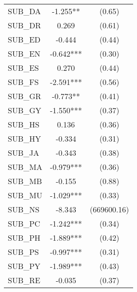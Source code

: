 \begin{table}[htb]
\begin{threeparttable}
\begin{tabular}{l c c}
      SUB\_DA                               & -1.255**               & (0.65)               \\
      SUB\_DR                               & 0.269                  & (0.61)               \\
      SUB\_ED                               & -0.444                 & (0.44)               \\
      SUB\_EN                               & -0.642***              & (0.30)               \\
      SUB\_ES                               & 0.270                  & (0.44)               \\
      SUB\_FS                               & -2.591***              & (0.56)               \\
      SUB\_GR                               & -0.773**               & (0.41)               \\
      SUB\_GY                               & -1.550***              & (0.37)               \\
      SUB\_HS                               & 0.136                  & (0.36)               \\
      SUB\_HY                               & -0.334                 & (0.31)               \\
      SUB\_JA                               & -0.343                 & (0.38)               \\
      SUB\_MA                               & -0.979***              & (0.36)               \\
      SUB\_MB                               & -0.155                 & (0.88)               \\
      SUB\_MU                               & -1.029***              & (0.33)               \\
      SUB\_NS                               & -8.343                 & (669600.16)          \\
      SUB\_PC                               & -1.242***              & (0.34)               \\
      SUB\_PH                               & -1.889***              & (0.42)               \\
      SUB\_PS                               & -0.997***              & (0.31)               \\
      SUB\_PY                               & -1.989***              & (0.43)               \\
      SUB\_RE                               & -0.035                 & (0.37)               \\

\end{tabular}
\end{threeparttable}
\end{table}
